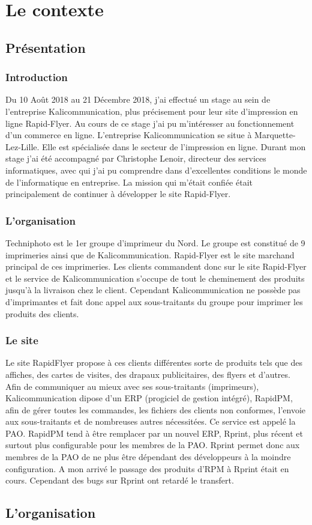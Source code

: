 \documentclass[a4paper]{report}
\begin{document}
\tableofcontents
\part{Le contexte}
\chapter{Présentation}
\section{Introduction}
Du 10 Août 2018 au 21 Décembre 2018, j'ai effectué un stage au sein de l'entreprise Kalicommunication, plus précisement pour leur site d'impression en ligne Rapid-Flyer. Au cours de ce stage j'ai pu m'intéresser au fonctionnement d'un commerce en ligne.\newline
L'entreprise Kalicommunication se situe à Marquette-Lez-Lille. Elle est spécialisée dans le secteur de l'impression en ligne.\newline
Durant mon stage j'ai été accompagné par Christophe Lenoir, directeur des services informatiques, avec qui j'ai pu comprendre dans d'excellentes conditions le monde de l'informatique en entreprise. La mission qui m'était confiée était principalement de continuer à développer le site Rapid-Flyer.
\section{L'organisation}
Techniphoto est le 1er groupe d'imprimeur du Nord. Le groupe est constitué de 9 imprimeries ainsi que de Kalicommunication. Rapid-Flyer est le site marchand principal de ces imprimeries. Les clients commandent donc sur le site Rapid-Flyer et le service de Kalicommunication s'occupe de tout le cheminement des produits jusqu'à la livraison chez le client. Cependant Kalicommunication ne possède pas d'imprimantes et fait donc appel aux sous-traitants du groupe pour imprimer les produits des clients.

\section{Le site}
Le site RapidFlyer propose à ces clients différentes sorte de produits tels que des affiches, des cartes de visites, des drapaux publicitaires, des flyers et d’autres. 
Afin de communiquer au mieux avec ses sous-traitants (imprimeurs), Kalicommunication dipose d’un ERP (progiciel de gestion intégré), RapidPM, afin de gérer toutes les commandes, les fichiers des clients non conformes, l’envoie aux sous-traitants et de nombreuses autres nécessitées. Ce service est appelé la PAO. RapidPM tend à être remplacer par un nouvel ERP, Rprint, plus récent et surtout plus configurable pour les membres de la PAO. Rprint permet donc aux membres de la PAO de ne plus être dépendant des développeurs à la moindre configuration. A mon arrivé le passage des produits d’RPM à Rprint était en cours. Cependant des bugs sur Rprint ont retardé le transfert. %

\chapter{L'organisation}
\end{document}
